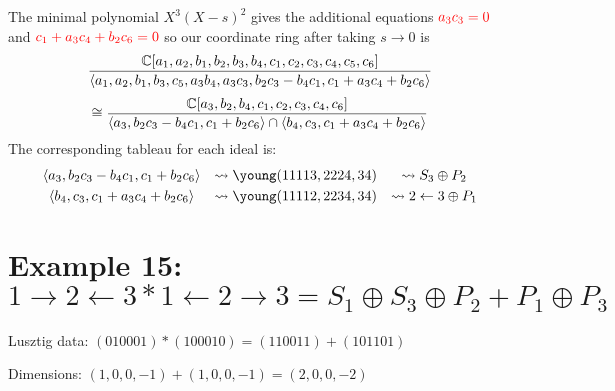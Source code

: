 \documentclass{article}
\begin{document}
The minimal polynomial $X^3(X-s)^2$ gives the additional equations ${\color{red} a_3c_3 = 0}$ and ${\color{red} c_1 + a_3c_4 + b_2c_6 = 0}$ so our coordinate ring after taking $s \rightarrow 0$ is
$$\frac{\mathbb C[a_1,a_2,b_1,b_2,b_3,b_4,c_1,c_2,c_3,c_4,c_5,c_6]}{\langle a_1,a_2,b_1,b_3,c_5,a_3b_4,a_3c_3,b_2c_3-b_4c_1,c_1+a_3c_4+b_2c_6 \rangle}$$
$$ \cong \frac{\mathbb C[a_3,b_2,b_4,c_1,c_2,c_3,c_4,c_6]}{\langle a_3,b_2c_3-b_4c_1,c_1+b_2c_6 \rangle \cap \langle b_4,c_3,c_1+a_3c_4+b_2c_6 \rangle}$$
The corresponding tableau for each ideal is:
\[\begin{array}{ccc}\vspace{1mm}
    \langle a_3,b_2c_3-b_4c_1,c_1+b_2c_6 \rangle &\leadsto \young(11113,2224,34) &\leadsto S_3 \oplus P_2 \\ 
    \langle b_4,c_3,c_1+a_3c_4+b_2c_6 \rangle &\leadsto \young(11112,2234,34) &\leadsto 2 \leftarrow 3 \oplus P_1
\end{array}
\]

\section{Example 15: $1 \rightarrow 2 \leftarrow 3 * 1 \leftarrow 2 \rightarrow 3 = S_1 \oplus S_3 \oplus P_2 + P_1 \oplus P_3$}
Lusztig data: $(010001) * (100010) = (110011) + (101101)$

Dimensions: $(1,0,0,-1) + (1,0,0,-1) = (2,0,0,-2)$
\end{document}
